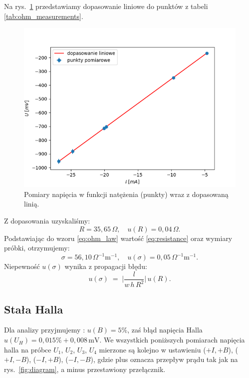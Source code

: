 \documentclass[12pt]{article}
\begin{document}
Na rys.~\ref{fig:ohm_measurments} przedstawiamy dopasowanie liniowe do punktów z tabeli \ref{tab:ohm_measurements}.  
\begin{figure}[H]
    \centering
    \includegraphics[scale=0.5]{ohm_law}
    \caption{Pomiary napięcia w funkcji natężenia (punkty) wraz z dopasowaną linią.}
    \label{fig:ohm_measurments}
\end{figure}

Z dopasowania uzyskaliśmy:
\begin{equation}
    R = 35{,}65\,\Omega, \quad u(R) = 0{,}04\,\Omega.
    \label{eq:resistance}
\end{equation}
Podstawiając do wzoru \ref{eq:ohm_law} wartość \eqref{eq:resistance} oraz wymiary próbki, otrzymujemy:
\begin{equation}
    \sigma = 56{,}10\,\Omega^{-1}\mathrm{m}^{-1}, \quad u(\sigma) = 0{,}05\,\Omega^{-1}\mathrm{m}^{-1}.
    \label{eq:final_conductivity}
\end{equation}
Niepewność $u(\sigma)$ wynika z propagacji błędu:
\[
    u(\sigma) \;=\; \biggl|\frac{l}{w\,h\,R^2}\biggr|\,u(R).
\]

\subsection{Stała Halla}
Dla analizy przyjmujemy \cite{magnetometer}: $u(B) = 5\%$, zaś błąd napięcia Halla \cite{multimeter_big} $u(U_H) = 0{,}015\%\!+\!0{,}008\,\mathrm{mV}$.
We wszystkich poniższych pomiarach napięcia halla na próbce $U_1$, $U_2$, $U_3$, $U_4$ mierzone są kolejno w ustawieniu ($+I,+B$), ($+I,-B$), ($-I,+B$), ($-I,-B$), gdzie plus oznacza przepływ prądu tak jak na rys.~\ref{fig:diagram}, a minus przestawiony przełącznik.
\end{document}
